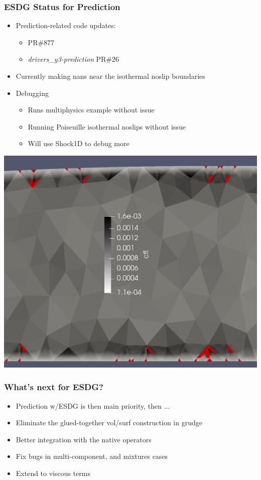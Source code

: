 \begin{frame}\frametitle{ESDG Status for Prediction}
\begin{multicols}{2}
\begin{itemize}
\item Prediction-related code updates:
\begin{itemize}
\item \mirgecom{} PR\#877
\item \textit{drivers\_y3-prediction} PR\#26
\end{itemize}
\item Currently making nans near the isothermal noslip boundaries
\item Debugging
\begin{itemize}
   \item Runs multiphysics example without issue
   \item Running Poiseuille isothermal noslips without issue 
   \item Will use Shock1D to debug more
\end{itemize}
\end{itemize}
\columnbreak
\includegraphics[width=.48\textwidth]{figures/prediction-esdg-nans.png}
\end{multicols}
\end{frame}

\begin{frame}\frametitle{What's next for ESDG?}
\begin{itemize}
\item Prediction w/ESDG is then main priority, then ...
\item Eliminate the glued-together vol/surf construction in grudge
\item Better integration with the native operators
\item Fix bugs in multi-component, and mixtures cases
\item Extend to viscous terms
\end{itemize}
\end{frame}

